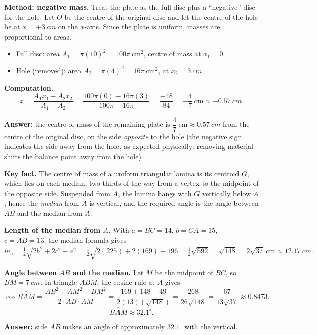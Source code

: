 \documentclass[11pt]{article}
\begin{document}
\begin{corrige}
\textbf{Method: negative mass.} Treat the plate as the full disc plus a ``negative'' disc for the hole. Let $O$ be the centre of the original disc and let the centre of the hole be at $x = +\SI{3}{cm}$ on the $x$-axis. Since the plate is uniform, masses are proportional to areas.

\begin{itemize}
\item Full disc: area $A_1 = \pi(10)^2 = 100\pi\ \mathrm{cm^2}$, centre of mass at $x_1 = 0$.
\item Hole (removed): area $A_2 = \pi(4)^2 = 16\pi\ \mathrm{cm^2}$, at $x_2 = \SI{3}{cm}$.
\end{itemize}

\textbf{Computation.}
\[
\bar{x} = \frac{A_1 x_1 - A_2 x_2}{A_1 - A_2} = \frac{100\pi(0) - 16\pi(3)}{100\pi - 16\pi} = \frac{-48}{84} = -\frac{4}{7}\ \mathrm{cm} \approx \SI{-0.57}{cm}.
\]

\textbf{Answer:} the centre of mass of the remaining plate is $\dfrac{4}{7}\ \mathrm{cm} \approx \SI{0.57}{cm}$ from the centre of the original disc, on the side \emph{opposite} to the hole (the negative sign indicates the side away from the hole, as expected physically: removing material shifts the balance point away from the hole).
\end{corrige}

\begin{corrige}
\textbf{Key fact.} The centre of mass of a uniform triangular lamina is its centroid $G$, which lies on each median, two-thirds of the way from a vertex to the midpoint of the opposite side. Suspended from $A$, the lamina hangs with $G$ vertically below $A$; hence the \emph{median} from $A$ is vertical, and the required angle is the angle between $AB$ and the median from $A$.

\textbf{Length of the median from $A$.} With $a = BC = 14$, $b = CA = 15$, $c = AB = 13$, the median formula gives
\[
m_a = \tfrac12\sqrt{2b^2 + 2c^2 - a^2} = \tfrac12\sqrt{2(225) + 2(169) - 196} = \tfrac12\sqrt{592} = \sqrt{148} = 2\sqrt{37}\ \mathrm{cm} \approx \SI{12.17}{cm}.
\]

\textbf{Angle between $AB$ and the median.} Let $M$ be the midpoint of $BC$, so $BM = \SI{7}{cm}$. In triangle $ABM$, the cosine rule at $A$ gives
\[
\cos\widehat{BAM} = \frac{AB^2 + AM^2 - BM^2}{2\cdot AB \cdot AM} = \frac{169 + 148 - 49}{2(13)(\sqrt{148})} = \frac{268}{26\sqrt{148}} = \frac{67}{13\sqrt{37}} \approx 0.8473.
\]
\[
\widehat{BAM} \approx 32.1^\circ.
\]

\textbf{Answer:} side $AB$ makes an angle of approximately $32.1^\circ$ with the vertical.
\end{corrige}
\end{document}
